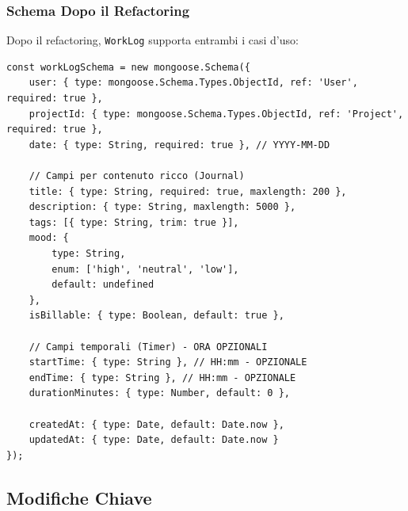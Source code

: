 \documentclass[11pt,a4paper]{article}
\begin{document}
\subsubsection{Schema Dopo il Refactoring}

Dopo il refactoring, \texttt{WorkLog} supporta entrambi i casi d'uso:

\begin{lstlisting}[caption=Schema WorkLog Unificato]
const workLogSchema = new mongoose.Schema({
    user: { type: mongoose.Schema.Types.ObjectId, ref: 'User', required: true },
    projectId: { type: mongoose.Schema.Types.ObjectId, ref: 'Project', required: true },
    date: { type: String, required: true }, // YYYY-MM-DD
    
    // Campi per contenuto ricco (Journal)
    title: { type: String, required: true, maxlength: 200 },
    description: { type: String, maxlength: 5000 },
    tags: [{ type: String, trim: true }],
    mood: { 
        type: String, 
        enum: ['high', 'neutral', 'low'],
        default: undefined 
    },
    isBillable: { type: Boolean, default: true },
    
    // Campi temporali (Timer) - ORA OPZIONALI
    startTime: { type: String }, // HH:mm - OPZIONALE
    endTime: { type: String }, // HH:mm - OPZIONALE
    durationMinutes: { type: Number, default: 0 },
    
    createdAt: { type: Date, default: Date.now },
    updatedAt: { type: Date, default: Date.now }
});
\end{lstlisting}

\subsection{Modifiche Chiave}
\end{document}
